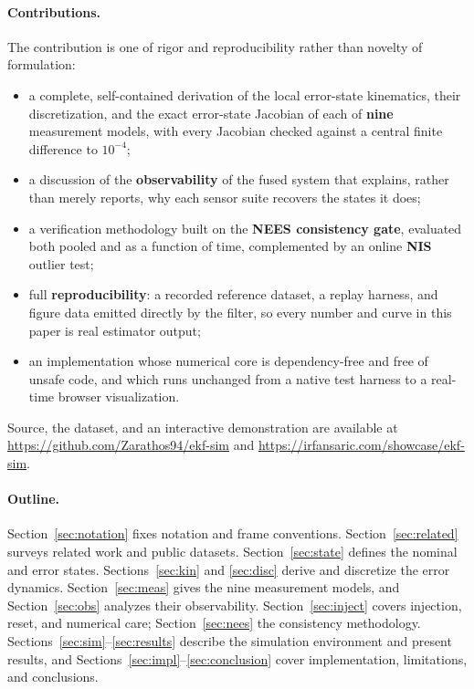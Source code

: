 \documentclass[11pt]{article}
\begin{document}
\paragraph{Contributions.}
The contribution is one of rigor and reproducibility rather than novelty of formulation:
\begin{itemize}
  \item a complete, self-contained derivation of the local error-state kinematics, their
        discretization, and the exact error-state Jacobian of each of \textbf{nine} measurement models,
        with every Jacobian checked against a central finite difference to $10^{-4}$;
  \item a discussion of the \textbf{observability} of the fused system that explains, rather than
        merely reports, why each sensor suite recovers the states it does;
  \item a verification methodology built on the \textbf{NEES consistency gate}, evaluated both pooled
        and as a function of time, complemented by an online \textbf{NIS} outlier test;
  \item full \textbf{reproducibility}: a recorded reference dataset, a replay harness, and figure data
        emitted directly by the filter, so every number and curve in this paper is real estimator
        output;
  \item an implementation whose numerical core is dependency-free and free of unsafe code, and which
        runs unchanged from a native test harness to a real-time browser visualization.
\end{itemize}
Source, the dataset, and an interactive demonstration are available at
\url{https://github.com/Zarathos94/ekf-sim} and \url{https://irfansaric.com/showcase/ekf-sim}.

\paragraph{Outline.}
Section~\ref{sec:notation} fixes notation and frame conventions. Section~\ref{sec:related} surveys
related work and public datasets. Section~\ref{sec:state} defines the nominal and error states.
Sections~\ref{sec:kin} and \ref{sec:disc} derive and discretize the error dynamics.
Section~\ref{sec:meas} gives the nine measurement models, and Section~\ref{sec:obs} analyzes their
observability. Section~\ref{sec:inject} covers injection, reset, and numerical care;
Section~\ref{sec:nees} the consistency methodology. Sections~\ref{sec:sim}--\ref{sec:results} describe
the simulation environment and present results, and
Sections~\ref{sec:impl}--\ref{sec:conclusion} cover implementation, limitations, and conclusions.
\end{document}
